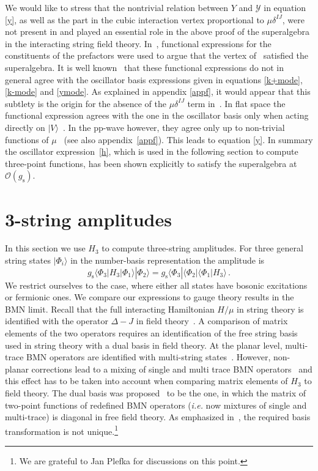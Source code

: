 \documentclass[12pt]{article}
\def\D{\Delta}
\def\d{\delta}
\def\m{\mu}
\def\mc{\mathcal}
\def\la{\langle}
\def\ra{\rangle}
\numberwithin{equation}{section} \setlength{\textwidth}{17cm}
\begin{document}
\noindent We would like to stress that the nontrivial relation between $Y$ and ${\mc Y}$ in equation \eqref{y}, as 
well as the part in the cubic interaction vertex proportional to $\m\d^{IJ}$, were not present in 
\cite{sv,sv2} and played an essential role in the above proof of the superalgebra in the interacting string field 
theory. 
In~\cite{sv}, functional expressions for the constituents of the prefactors were used to argue that the vertex 
of~\cite{sv} satisfied the superalgebra. 
It is well known~\cite{gs, gsb} that these functional expressions do not in general agree with the oscillator basis 
expressions given in equations \eqref{k+mode}, \eqref{k-mode} and \eqref{ymode}.
As explained in appendix \ref{appf}, it would appear that this subtlety is the origin for 
the absence of the $\m\d^{IJ}$ term in~\cite{sv}. In flat space the functional expression agrees with the one in the 
oscillator basis only when acting directly on $|V\ra$~\cite{gs,gsb}. In the pp-wave however, they agree only up to 
non-trivial functions of $\m$~\cite{ap} (see also appendix~\ref{appf}). This leads to equation \eqref{y}. 
In summary the
oscillator expression~\eqref{h}, which is used in the following section to compute three-point functions,
has been shown explicitly to satisfy the superalgebra at ${\mc O}(g_{\text{s}})$.
\section{3-string amplitudes}\label{sec5}
In this section we use $H_3$ to compute three-string amplitudes. 
For three general string states $|\Phi_i\ra$ in the number-basis representation
the amplitude is
\begin{equation}
g_{\text{s}}\la\Phi_3|H_3|\Phi_1\ra|\Phi_2\ra =
g_{\text{s}}\la\Phi_3|\la\Phi_2|\la\Phi_1|H_3\ra\,.
\end{equation}
We restrict ourselves to the case, where either all states have bosonic excitations or fermionic ones. 
We compare our expressions to gauge theory results in the BMN limit. 
Recall that the full interacting Hamiltonian $H/\m$ in string theory is identified with the operator 
$\D-J$ in field theory~\cite{bmn,gross,verlinde}. A comparison of matrix elements of the two operators
requires an identification of the free string basis used in string theory with a dual basis in field theory. 
At the planar level, multi-trace BMN operators are identified with 
multi-string states~\cite{bmn}. However, non-planar corrections lead to a mixing of single and multi trace BMN 
operators~\cite{jan2,freedman2} and this effect has to be taken into account when comparing
matrix elements of $H_3$ to field theory. The dual basis was proposed~\cite{vv,vsv,gomis} to be the one, in which 
the matrix of two-point functions of redefined BMN operators ({\it i.e.} now mixtures of single and multi-trace)
is diagonal in free field theory. As emphasized in~\cite{vsv,gomis}, the required basis transformation is not 
unique.\footnote{We are grateful to Jan Plefka for discussions on this point.}
\end{document}
